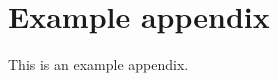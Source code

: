 \chapter{Example appendix} \label{appendix:example-appendix}

This is an example appendix. \cite{FDD_DH08}